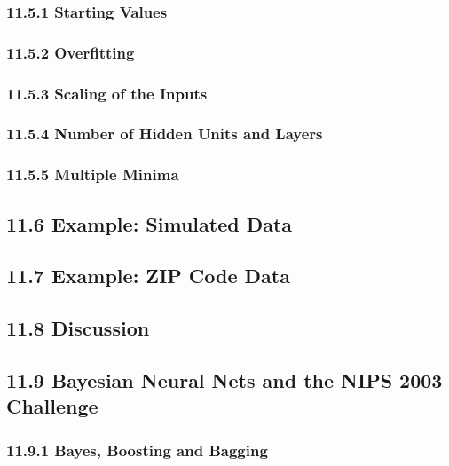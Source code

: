 \documentclass[11pt]{article}
\begin{document}
\subsubsection{11.5.1 Starting Values}\label{starting-values}

\subsubsection{11.5.2 Overfitting}\label{overfitting}

\subsubsection{11.5.3 Scaling of the
Inputs}\label{scaling-of-the-inputs}

\subsubsection{11.5.4 Number of Hidden Units and
Layers}\label{number-of-hidden-units-and-layers}

\subsubsection{11.5.5 Multiple Minima}\label{multiple-minima}

\subsection{11.6 Example: Simulated Data}\label{example-simulated-data}

\subsection{11.7 Example: ZIP Code Data}\label{example-zip-code-data}

\subsection{11.8 Discussion}\label{discussion}

\subsection{11.9 Bayesian Neural Nets and the NIPS 2003
Challenge}\label{bayesian-neural-nets-and-the-nips-2003-challenge}

\subsubsection{11.9.1 Bayes, Boosting and
Bagging}\label{bayes-boosting-and-bagging}
\end{document}
